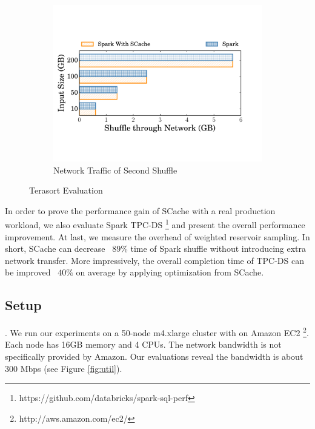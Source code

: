 \begin{figure}
\begin{minipage}[t]{.32\linewidth}
\begin{subfigure}{\linewidth}
			\begin{minipage}{\linewidth}
				\includegraphics[width=\linewidth]{fig/tera_shuffle}
				\caption{Network Traffic of Second Shuffle}
				\label{fig:terashuffle}
			\end{minipage}
		\end{subfigure}
		\caption{Terasort Evaluation}
	\end{minipage}
	\vspace{-1em}
\end{figure}
In order to prove the performance gain of SCache with a real production workload, we also evaluate Spark TPC-DS \footnote{https://github.com/databricks/spark-sql-perf} and present the overall performance improvement.
At last, we measure the overhead of weighted reservoir sampling. 
In short, SCache can decrease ~$89\%$ time of Spark shuffle without introducing extra network transfer. 
More impressively, the overall completion time of TPC-DS can be improved ~$40\%$ on average by applying optimization from SCache.

\subsection{Setup}\label{stepup}
 \cite{sparkconf}. 
We run our experiments on a 50-node m4.xlarge cluster with on Amazon EC2 \footnote{http://aws.amazon.com/ec2/}. 
Each node has 16GB memory and 4 CPUs. The network bandwidth is not specifically provided by Amazon. 
Our evaluations reveal the bandwidth is about 300 Mbps (see Figure \ref{fig:util}).

